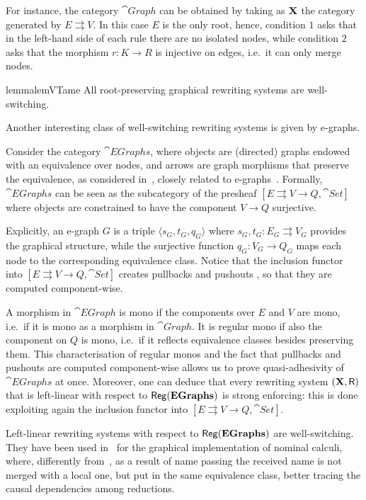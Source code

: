 For instance, the category $\cat{Graph}$ can be obtained
by taking as $\textbf {\textup{X}}$ the category generated by $E \rightrightarrows V$. In this case $E$ is the only root, hence, condition $1$ asks that in the left-hand side of each rule
there are no isolated nodes, while condition $2$ asks that the
morphism $r: K \to R$ is injective on edges, i.e.~it can only merge nodes.

\begin{lemma}{lemma}{lemVTame}
	\label{bono}
	All root-preserving graphical rewriting systems are well-switching.
\end{lemma}

Another interesting class of well-switching rewriting systems is given by e-graphs.

\begin{example}[E-graphs]
	Consider the category $\cat{EGraphs}$, where objects are (directed)
	graphs endowed with an equivalence over nodes, and arrows are graph
	morphisms that preserve the equivalence, as considered
	in~\cite{BaldanGM06}, closely related to e-graphs~\cite{WNW:egg}. 
	Formally, $\cat{EGraphs}$ can be seen as the
	subcategory of the presheaf
	$[E \rightrightarrows V \to Q, \cat{Set}]$ where objects are
	constrained to have the component $V \to Q$ surjective. 
	
	Explicitly, an
	e-graph $G$ is a triple $\langle s_G, t_G, q_G \rangle$ where
	$s_G, t_G: E_G \rightrightarrows V_G$ provides the graphical
	structure, while the surjective function $q_G : V_G \to Q_G$ maps
	each node to the corresponding equivalence class. 
	Notice that the inclusion functor into  $[E \rightrightarrows V \to Q, \cat{Set}]$ 
	creates pullbacks and pushouts \cite{mac2013categories}, so that they are computed component-wise.
	
	A morphism in $\cat{EGraph}$ is mono if the components over $E$
	and $V$ are mono, i.e.~if it is mono as a morphism in
	$\cat{Graph}$. It is regular mono if also the component on
	$Q$ is mono, i.e.~if it reflects equivalence classes besides
	preserving them. This characterisation of regular monos and the fact that pullbacks and pushouts are computed component-wise allows us to prove quasi-adhesivity of $\cat{EGraphs}$ at once. Moreover, one can deduce that every rewriting system $(\textbf {\textup{X}}, \mathsf{R})$ that is left-linear with respect to $\mathsf{Reg}(\mathbf{EGraphs})$ is strong enforcing: this is done exploiting again the inclusion functor into $[E \rightrightarrows V \to Q, \cat{Set}]$.
	
	Left-linear rewriting systems with respect to $\mathsf{Reg}(\mathbf{EGraphs})$ are well-switching. They have been used in~\cite{BaldanGM06} for the graphical implementation of nominal calculi, where,
	differently from~\cite{Gad07}, as a result of name passing the received name is not merged with a local one, but put in the same equivalence class, better tracing the causal dependencies among reductions.
\end{example}


